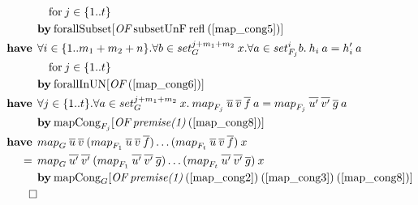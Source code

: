 \begin{align}
 & \quad \text{for} \: j \in \{1..t\} \nonumber \\*
 & \by \OF{\text{forallSubset}}{\text{subsetUnF} \: \text{refl} \: (\ref{map_cong5})} \nonumber \\
%
\have & \forall i \in \{1..m_1+m_2+n\}. \forall b \in set_G^{j+m_1+m_2} \: x. \forall a \in set_{F_j}^i b. \: h_i \: a = h'_i \: a \label{map_cong7} \\*
 & \quad \text{for} \: j \in \{1..t\} \nonumber \\*
 & \by \OF{\text{forallInUN}}{(\ref{map_cong6})} \nonumber \\
%
\have & \forall j \in \{1..t\}. \forall a \in set_G^{j+m_1+m_2} \: x. \: \map{F_j}{u}{v}{f} \: a = \map{F_j}{u'}{v'}{g} \: a \label{map_cong8} \\*
 & \by \OF{\text{mapCong}_{F_j}}{\textit{premise(1)} \: (\ref{map_cong8})} \nonumber \\
%
\have & \map{G}{u}{v}{}(\map{F_1}{u}{v}{f})\dots(\map{F_t}{u}{v}{f}) \: x \nonumber \\*
= \:\: & \map{G}{u'}{v'}{}(\map{F_1}{u'}{v'}{g})\dots(\map{F_t}{u'}{v'}{g}) \: x \\*
 & \by \OF{\text{mapCong}_G}{\textit{premise(1)} \: (\ref{map_cong2}) \: (\ref{map_cong3}) \: (\ref{map_cong8})} \nonumber \\*
\qed \nonumber
\end{align}

